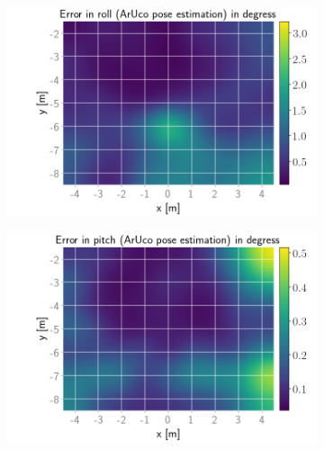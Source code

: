 \documentclass[../Head/report.tex]{subfiles}
\begin{document}
\begin{figure}[H]
    \centering
    \begin{subfigure}[t]{.337\textwidth}
        \centering
        \includegraphics[width=\textwidth]{../Figures/GPS2Vision_pose_estimation_test/test2_aruco_board_width_0.3_space_0.15/aruco_pose_estimation_error_roll.png}
        \caption{}
        \label{fig:GPS2Vision_pose_estimation_test2_roll}
    \end{subfigure}
    \hspace{-0.9em}
    \begin{subfigure}[t]{.337\textwidth}
        \centering
        \includegraphics[width=\textwidth]{../Figures/GPS2Vision_pose_estimation_test/test2_aruco_board_width_0.3_space_0.15/aruco_pose_estimation_error_pitch.png}
        \caption{}
        \label{fig:GPS2Vision_pose_estimation_test2_pitch}
    \end{subfigure}

\end{figure}
\end{document}

